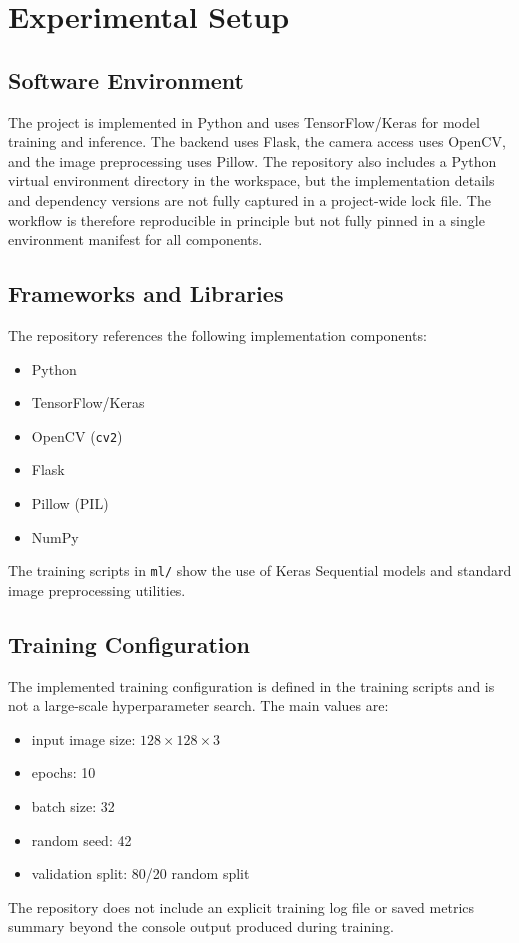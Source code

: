 \documentclass[11pt,a4paper]{article}
\begin{document}
\section{Experimental Setup}
\subsection{Software Environment}
The project is implemented in Python and uses TensorFlow/Keras for model training and inference. The backend uses Flask, the camera access uses OpenCV, and the image preprocessing uses Pillow. The repository also includes a Python virtual environment directory in the workspace, but the implementation details and dependency versions are not fully captured in a project-wide lock file. The workflow is therefore reproducible in principle but not fully pinned in a single environment manifest for all components.

\subsection{Frameworks and Libraries}
The repository references the following implementation components:
\begin{itemize}[leftmargin=1.5em]
    \item Python
    \item TensorFlow/Keras
    \item OpenCV (\texttt{cv2})
    \item Flask
    \item Pillow (PIL)
    \item NumPy
\end{itemize}
The training scripts in \texttt{ml/} show the use of Keras Sequential models and standard image preprocessing utilities.

\subsection{Training Configuration}
The implemented training configuration is defined in the training scripts and is not a large-scale hyperparameter search. The main values are:
\begin{itemize}[leftmargin=1.5em]
    \item input image size: $128\times128\times3$
    \item epochs: 10
    \item batch size: 32
    \item random seed: 42
    \item validation split: 80/20 random split
\end{itemize}
The repository does not include an explicit training log file or saved metrics summary beyond the console output produced during training.
\end{document}
